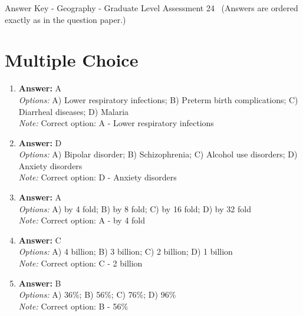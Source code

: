 \documentclass[12pt]{article}
\begin{document}
\begin{center}
Answer Key - Geography - Graduate Level Assessment 24 \
\small (Answers are ordered exactly as in the question paper.)
\end{center}

\section*{Multiple Choice}
\begin{enumerate}[label=\arabic*.]
\item \textbf{Answer:} A
\\ \textit{Options:} A) Lower respiratory infections; B) Preterm birth complications; C) Diarrheal diseases; D) Malaria
\\ \textit{Note:} Correct option: A - Lower respiratory infections
\item \textbf{Answer:} D
\\ \textit{Options:} A) Bipolar disorder; B) Schizophrenia; C) Alcohol use disorders; D) Anxiety disorders
\\ \textit{Note:} Correct option: D - Anxiety disorders
\item \textbf{Answer:} A
\\ \textit{Options:} A) by 4 fold; B) by 8 fold; C) by 16 fold; D) by 32 fold
\\ \textit{Note:} Correct option: A - by 4 fold
\item \textbf{Answer:} C
\\ \textit{Options:} A) 4 billion; B) 3 billion; C) 2 billion; D) 1 billion
\\ \textit{Note:} Correct option: C - 2 billion
\item \textbf{Answer:} B
\\ \textit{Options:} A) 36\%; B) 56\%; C) 76\%; D) 96\%
\\ \textit{Note:} Correct option: B - 56\%
\end{enumerate}
\end{document}
